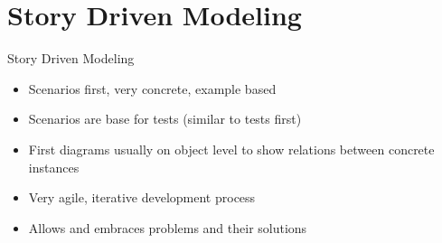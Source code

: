 ﻿\part{Story Driven Modeling}

\begin{frame}{Story Driven Modeling}
\begin{itemize}
\item Scenarios first, very concrete, example based
\item Scenarios are base for tests (similar to tests first)
\item First diagrams usually on object level to show relations between concrete instances
\item Very agile, iterative development process
\item Allows and embraces problems and their solutions
\end{itemize}
\end{frame}
